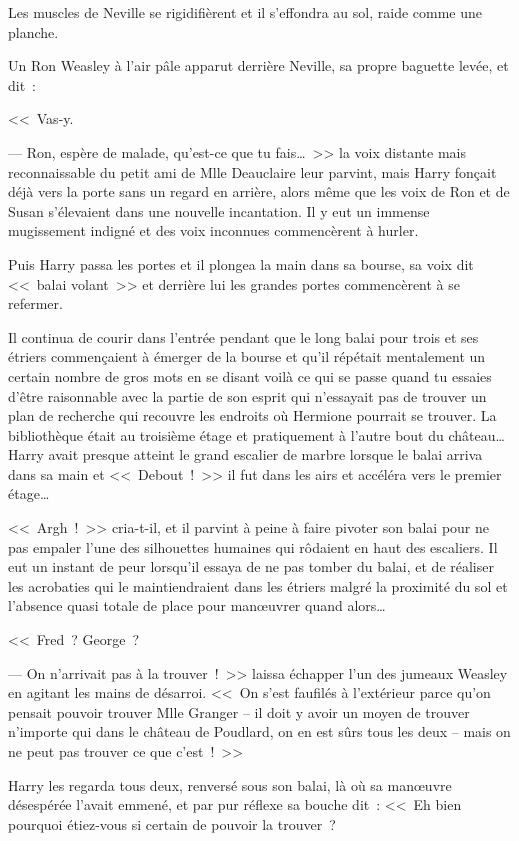 Les muscles de Neville se rigidifièrent et il s'effondra au sol, raide comme une planche.

Un Ron Weasley à l'air pâle apparut derrière Neville, sa propre baguette levée, et dit~:

<<~Vas-y.

--- Ron, espère de malade, qu'est-ce que tu fais…~>> la voix distante mais reconnaissable du petit ami de Mlle Deauclaire leur parvint, mais Harry fonçait déjà vers la porte sans un regard en arrière, alors même que les voix de Ron et de Susan s'élevaient dans une nouvelle incantation. Il y eut un immense mugissement indigné et des voix inconnues commencèrent à hurler.

Puis Harry passa les portes et il plongea la main dans sa bourse, sa voix dit <<~balai volant~>> et derrière lui les grandes portes commencèrent à se refermer.

Il continua de courir dans l'entrée pendant que le long balai pour trois et ses étriers commençaient à émerger de la bourse et qu'il répétait mentalement un certain nombre de gros mots en se disant voilà ce qui se passe quand tu essaies d'être raisonnable avec la partie de son esprit qui n'essayait pas de trouver un plan de recherche qui recouvre les endroits où Hermione pourrait se trouver. La bibliothèque était au troisième étage et pratiquement à l'autre bout du château… Harry avait presque atteint le grand escalier de marbre lorsque le balai arriva dans sa main et <<~Debout~!~>> il fut dans les airs et accéléra vers le premier étage…

<<~Argh~!~>> cria-t-il, et il parvint à peine à faire pivoter son balai pour ne pas empaler l'une des silhouettes humaines qui rôdaient en haut des escaliers. Il eut un instant de peur lorsqu'il essaya de ne pas tomber du balai, et de réaliser les acrobaties qui le maintiendraient dans les étriers malgré la proximité du sol et l'absence quasi totale de place pour manœuvrer quand alors…

<<~Fred~? George~?

--- On n'arrivait pas à la trouver~!~>> laissa échapper l'un des jumeaux Weasley en agitant les mains de désarroi. <<~On s'est faufilés à l'extérieur parce qu'on pensait pouvoir trouver Mlle Granger -- il doit y avoir un moyen de trouver n'importe qui dans le château de Poudlard, on en est sûrs tous les deux -- mais on ne peut pas trouver ce que c'est~!~>>

Harry les regarda tous deux, renversé sous son balai, là où sa manœuvre désespérée l'avait emmené, et par pur réflexe sa bouche dit~: <<~Eh bien pourquoi étiez-vous si certain de pouvoir la trouver~?

